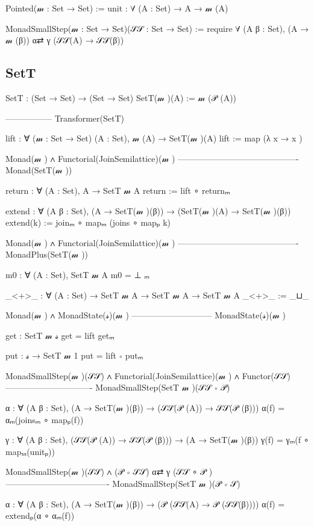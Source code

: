 \documentclass{article}
\begin{document}
Pointed(𝓂  : Set → Set) :=
  unit : ∀ (A : Set) → A → 𝓂 (A)

MonadSmallStep(𝓂  : Set → Set)(𝒮𝒮 : Set → Set) := 
  require
    ∀ (A β : Set), (A → 𝓂 (β)) α⇄ γ (𝒮𝒮(A) → 𝒮𝒮(β))



\subsection{SetT}
\label{section:Proofs+Definitions:SetT}

SetT : (Set → Set) → (Set → Set)
SetT(𝓂 )(A) := 𝓂 (𝒫 (A))

-----------------
Transformer(SetT)

lift : ∀ (𝓂  : Set → Set) (A : Set), 𝓂 (A) → SetT(𝓂 )(A)
lift := map (λ x → { x })

Monad(𝓂 ) ∧ Functorial(JoinSemilattice)(𝓂 )
-------------------------------------------
Monad(SetT(𝓂 ))

return : ∀ (A : Set), A → SetT 𝓂  A
return := lift ∘ returnₘ

extend : ∀ (A β : Set), (A → SetT(𝓂 )(β)) → (SetT(𝓂 )(A) → SetT(𝓂 )(β))
extend(k) := joinₘ ∘ mapₘ (joins ∘ mapₚ k)

Monad(𝓂 ) ∧ Functorial(JoinSemilattice)(𝓂 )
-------------------------------------------
MonadPlus(SetT(𝓂 ))

m0 : ∀ (A : Set), SetT 𝓂  A
m0 = ⊥ ₘ

_<+>_ : ∀ (A : Set) → SetT 𝓂  A → SetT 𝓂  A → SetT 𝓂  A
_<+>_ := _⊔_

Monad(𝓂 ) ∧ MonadState(𝓈)(𝓂 )
-----------------------------
MonadState(𝓈)(𝓂 )

get : SetT 𝓂  𝓈
get = lift getₘ

put : 𝓈 → SetT 𝓂  1
put = lift ∘ putₘ

MonadSmallStep(𝓂 )(𝒮𝒮) ∧ Functorial(JoinSemilattice)(𝓂 ) ∧ Functor(𝒮𝒮)
-------------------------------
MonadSmallStep(SetT 𝓂 )(𝒮𝒮 ∘ 𝒫)

α : ∀ (A β : Set), (A → SetT(𝓂 )(β)) → (𝒮𝒮(𝒫 (A)) → 𝒮𝒮(𝒫 (β)))
α(f) = αₘ(joinsₘ ∘ mapₚ(f))

γ : ∀ (A β : Set), (𝒮𝒮(𝒫 (A)) → 𝒮𝒮(𝒫 (β))) → (A → SetT(𝓂 )(β))
γ(f) = γₘ(f ∘ mapₛₛ(unitₚ))

MonadSmallStep(𝓂 )(𝒮𝒮) ∧ (𝒫 ∘ 𝒮𝒮) α⇄ γ (𝒮𝒮 ∘ 𝒫 )
-------------------------------------
MonadSmallStep(SetT 𝓂 )(𝒫 ∘ 𝒮)

α : ∀ (A β : Set), (A → SetT(𝓂 )(β)) → (𝒫 (𝒮𝒮(A) → 𝒫 (𝒮𝒮(β))))
α(f) = extendₚ(α ∘ αₘ(f))
\end{document}
